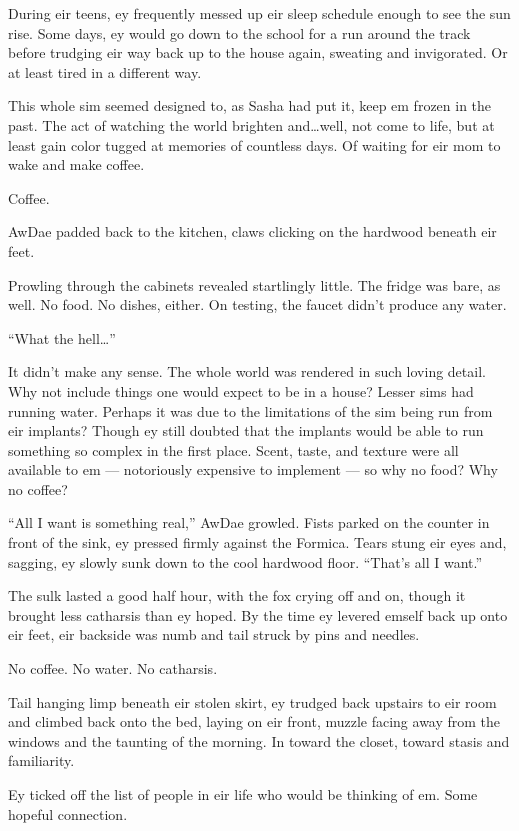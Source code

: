 During eir teens, ey frequently messed up eir sleep schedule enough to see the sun rise. Some days, ey would go down to the school for a run around the track before trudging eir way back up to the house again, sweating and invigorated. Or at least tired in a different way.

This whole sim seemed designed to, as Sasha had put it, keep em frozen in the past. The act of watching the world brighten and\ldots{}well, not come to life, but at least gain color tugged at memories of countless days. Of waiting for eir mom to wake and make coffee.

Coffee.

AwDae padded back to the kitchen, claws clicking on the hardwood beneath eir feet.

Prowling through the cabinets revealed startlingly little. The fridge was bare, as well. No food. No dishes, either. On testing, the faucet didn't produce any water.

``What the hell\ldots{}''

It didn't make any sense. The whole world was rendered in such loving detail. Why not include things one would expect to be in a house? Lesser sims had running water. Perhaps it was due to the limitations of the sim being run from eir implants? Though ey still doubted that the implants would be able to run something so complex in the first place. Scent, taste, and texture were all available to em — notoriously expensive to implement — so why no food? Why no coffee?

``All I want is something real,'' AwDae growled. Fists parked on the counter in front of the sink, ey pressed firmly against the Formica. Tears stung eir eyes and, sagging, ey slowly sunk down to the cool hardwood floor. ``That's all I want.''

The sulk lasted a good half hour, with the fox crying off and on, though it brought less catharsis than ey hoped. By the time ey levered emself back up onto eir feet, eir backside was numb and tail struck by pins and needles.

No coffee. No water. No catharsis.

Tail hanging limp beneath eir stolen skirt, ey trudged back upstairs to eir room and climbed back onto the bed, laying on eir front, muzzle facing away from the windows and the taunting of the morning. In toward the closet, toward stasis and familiarity.

Ey ticked off the list of people in eir life who would be thinking of em. Some hopeful connection.

